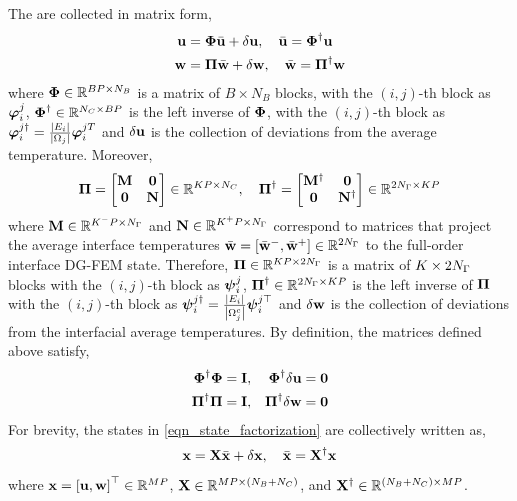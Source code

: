 The  are collected in matrix form,
\begin{subequations}
    \begin{align}
        \mathbf{u} &= \boldsymbol{\Phi}\bar{\mathbf{u}} + \delta\mathbf{u},\quad \bar{\mathbf{u}}=\boldsymbol{\Phi}^{\dagger}\mathbf{u}\\
        \mathbf{w} &= \boldsymbol{\Pi}\bar{\mathbf{w}} + \delta\mathbf{w},\quad \bar{\mathbf{w}}=\boldsymbol{\Pi}^{\dagger}\mathbf{w}
    \end{align}\label{eqn_state_factorization}
\end{subequations}
where $\boldsymbol{\Phi}\in\mathbb{R}^{BP\times N_B}$ is a matrix of $B\times N_{B}$ blocks, with the $(i,j)$-th block as $\boldsymbol{\varphi}_i^j$, $\boldsymbol{\Phi}^{\dagger}\in\mathbb{R}^{N_{C}\times BP}$ is the left inverse of $\boldsymbol{\Phi}$, with the $(i,j)$-th block as $\boldsymbol{\varphi}_i^{j\dagger}=\frac{|E_i|}{|\Omega_j|}\boldsymbol{\varphi}_i^{jT}$ and $\delta\mathbf{u}$ is the collection of deviations from the average temperature. Moreover,
\begin{equation}
    \boldsymbol{\Pi} = \begin{bmatrix}
        \mathbf{M} & \mathbf{0}\\
        \mathbf{0} & \mathbf{N}
    \end{bmatrix}\in\mathbb{R}^{KP\times N_C},\quad \boldsymbol{\Pi}^{\dagger} = \begin{bmatrix}
        \mathbf{M}^{\dagger} & \mathbf{0}\\
        \mathbf{0} & \mathbf{N}^{\dagger}
    \end{bmatrix}\in\mathbb{R}^{2N_{\Gamma}\times KP}
\end{equation}
where $\mathbf{M}\in\mathbb{R}^{K^{-}P\times N_{\Gamma}}$ and $\mathbf{N}\in\mathbb{R}^{K^{+}P\times N_{\Gamma}}$ correspond to matrices that project the average interface temperatures $\bar{\mathbf{w}}=\left[\bar{\mathbf{w}}^{-},\bar{\mathbf{w}}^{+}\right]\in\mathbb{R}^{2N_{\Gamma}}$ to the full-order interface DG-FEM state. Therefore, $\boldsymbol{\Pi}\in\mathbb{R}^{KP\times 2N_{\Gamma}}$ is a matrix of $K\times 2N_{\Gamma}$ blocks with the $(i,j)$-th block as $\boldsymbol{\psi}_i^j$, $\boldsymbol{\Pi}^{\dagger}\in\mathbb{R}^{2N_{\Gamma}\times KP}$ is the left inverse of $\boldsymbol{\Pi}$ with the $(i,j)$-th block as $\boldsymbol{\psi}_i^{j\dagger} = \frac{\left|E_i\right|}{\left|\Omega_j^c\right|}\boldsymbol{\psi}_i^{j\top}$ and $\delta\mathbf{w}$ is the collection of deviations from the interfacial average temperatures. By definition, the matrices defined above satisfy,
\begin{subequations}
    \begin{align*}
        \boldsymbol{\Phi}^{\dagger}\boldsymbol{\Phi} &= \mathbf{I}, & \boldsymbol{\Phi}^{\dagger}\delta\mathbf{u}  &= \mathbf{0}\\
        \boldsymbol{\Pi}^{\dagger}\boldsymbol{\Pi} &= \mathbf{I}, & \boldsymbol{\Pi}^{\dagger}\delta\mathbf{w} &= \mathbf{0}
    \end{align*}
\end{subequations}
For brevity, the states in \cref{eqn_state_factorization} are collectively written as,
\begin{equation}
    \mathbf{x} = \mathbf{X}\bar{\mathbf{x}} + \delta\mathbf{x},\quad \bar{\mathbf{x}} = \mathbf{X}^{\dagger}\mathbf{x}
\end{equation}
where $\mathbf{x}=\left[\mathbf{u},\mathbf{w}\right]^\top\in\mathbb{R}^{MP}$, $\mathbf{X}\in\mathbb{R}^{MP\times (N_B+N_C)}$, and $\mathbf{X}^{\dagger}\in\mathbb{R}^{(N_B+N_C)\times MP}$.

